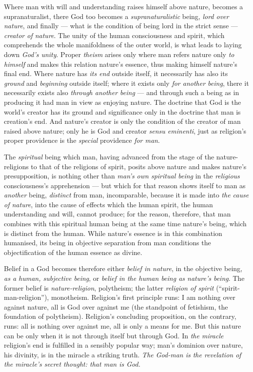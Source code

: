 \documentclass[12pt,a4paper]{book}
\begin{document}
Where man with will and understanding raises himself above nature, becomes a
supranaturalist, there God too becomes a \emph{supranaturalistic} being,
\emph{lord over nature}, and finally --- what is
the condition of being lord in the strict sense --- \emph{creator of nature}.
The unity of the human consciousness and spirit, which comprehends the whole
manifoldness of the outer world, is what leads to laying down \emph{God's
unity}. Proper \emph{theism} arises only where man refers nature only \emph{to
himself} and makes this relation nature's essence, thus making himself
nature's final end. Where nature has \emph{its end} outside itself, it
necessarily has also its \emph{ground} and \emph{beginning} outside itself;
where it exists only \emph{for another being}, there it necessarily exists
also \emph{through another being} --- and through such a being as in producing
it had man in view as enjoying nature. The doctrine that God is the world's
creator has its ground and significance only in the doctrine that man is
creation's end. And nature's creator is only the condition of the creator of
man raised above nature; only he is God and creator \textit{sensu eminenti},
just as religion's proper providence is the \emph{special} providence
\emph{for man}.

The \emph{spiritual} being which man, having advanced from the stage of the
nature-religions to that of the religions of spirit, posits above nature and
makes nature's presupposition, is nothing other than \emph{man's own spiritual
being} in the \emph{religious} consciousness's apprehension --- but which for
that reason shows itself to man as \emph{another} being, \emph{distinct} from
man, incomparable, because it is made into \emph{the cause of nature}, into
the cause of effects which the human spirit, the human understanding and will,
cannot produce; for the reason, therefore, that man combines with this
spiritual human being at the same time nature's being, which is distinct from
the human. While nature's essence is in this combination humanised, its being
in objective separation from man conditions the objectification of the human
essence as divine.

Belief in a God becomes therefore either \emph{belief in nature}, in the
objective being, \emph{as a human, subjective being}, or \emph{belief in the
human being as nature's being}. The former belief is
\emph{nature-religion}, polytheism; the latter \emph{religion of spirit}
(``spirit-man-religion''), monotheism. Religion's first principle runs: I am
nothing over against nature, all is God over against me (the standpoint of
fetishism, the foundation of polytheism). Religion's concluding proposition,
on the contrary, runs: all is nothing over against me, all is only a means for
me. But this nature can be only when it is not through itself but through God.
In \emph{the miracle} religion's end is fulfilled in a sensibly popular way;
man's dominion over nature, his divinity, is in the miracle a striking truth.
\emph{The God-man is the revelation of the miracle's secret thought: that man
is God.}
\end{document}

